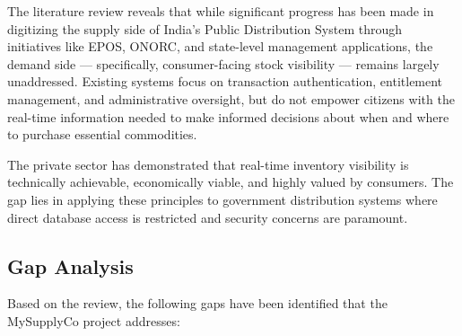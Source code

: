 The literature review reveals that while significant progress has been made in digitizing the supply side of India's Public Distribution System through initiatives like EPOS, ONORC, and state-level management applications, the demand side --- specifically, consumer-facing stock visibility --- remains largely unaddressed. Existing systems focus on transaction authentication, entitlement management, and administrative oversight, but do not empower citizens with the real-time information needed to make informed decisions about when and where to purchase essential commodities.

The private sector has demonstrated that real-time inventory visibility is technically achievable, economically viable, and highly valued by consumers. The gap lies in applying these principles to government distribution systems where direct database access is restricted and security concerns are paramount.

\subsection{Gap Analysis}

Based on the review, the following gaps have been identified that the MySupplyCo project addresses:

